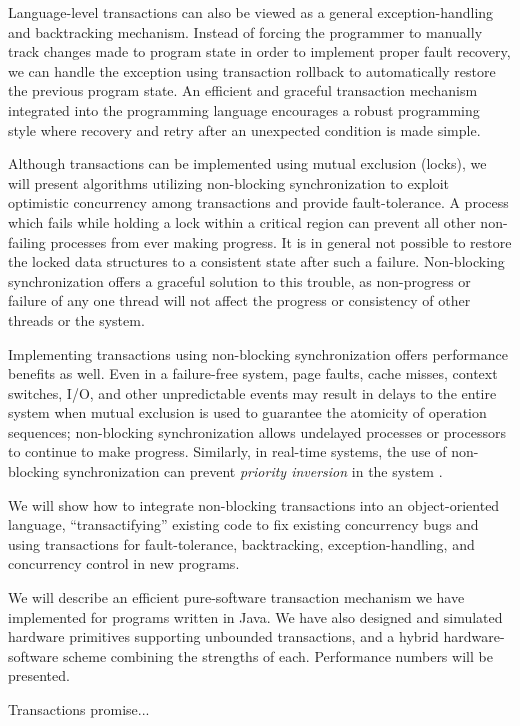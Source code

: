 \documentclass[twoside,twocolumn,notitlepage,letterpaper]{article}
\begin{document}
Language-level transactions can also be viewed as a general
exception-handling and backtracking mechanism.  Instead of forcing the
programmer to manually track changes made to program state in order to
implement proper fault recovery, we can handle the exception using
transaction rollback to automatically restore the previous program
state.  An efficient and graceful transaction mechanism
integrated into the programming language encourages a robust
programming style where recovery and retry after an unexpected
condition is made simple.

Although transactions can be implemented using mutual exclusion
(locks), we will present algorithms utilizing non-blocking synchronization to
exploit optimistic concurrency among transactions and provide fault-tolerance.
A process which fails while holding a lock within a
critical region can prevent all other non-failing processes from
ever making progress.
It is in general not possible to restore the
locked data structures to a consistent state after such a failure.
Non-blocking synchronization offers a graceful solution to this
trouble, as non-progress or failure of any one thread will not
affect the progress or consistency of other threads or the system.

Implementing transactions using
non-blocking synchronization offers performance benefits as well.
Even in a failure-free system, page faults, cache misses, context
switches, I/O, and other unpredictable events may result in delays to the
entire system when mutual exclusion is used to guarantee the atomicity
of operation sequences; non-blocking
synchronization allows undelayed processes or processors to continue
to make progress.
Similarly, in real-time systems, the use of non-blocking
synchronization can prevent \emph{priority inversion} in the system
\cite{Jones97}.

We will show how to integrate non-blocking transactions into an
object-oriented language, ``transactifying'' existing code to fix
existing concurrency bugs and using transactions for fault-tolerance,
backtracking, exception-handling, and concurrency control in new
programs.

We will describe an efficient pure-software transaction mechanism we have
implemented for programs written in Java.  We have also designed and
simulated hardware primitives supporting unbounded transactions, and a
hybrid hardware-software scheme combining the strengths of each.
Performance numbers will be presented.

Transactions promise...




\end{document}
